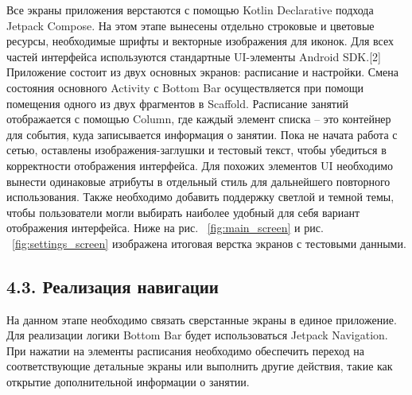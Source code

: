 \documentclass{vsureport}
\begin{document}
Все экраны приложения верстаются с помощью Kotlin Declarative подхода Jetpack Compose. На этом этапе вынесены отдельно строковые и цветовые ресурсы, необходимые шрифты и векторные изображения для иконок. Для всех частей интерфейса используются стандартные UI-элементы Android SDK.[2]
Приложение состоит из двух основных экранов: расписание и настройки. Смена состояния основного Activity с Bottom Bar осуществляется при помощи помещения одного из двух фрагментов в Scaffold. Расписание занятий отображается с помощью Column, где каждый элемент списка – это контейнер для события, куда записывается информация о занятии. Пока не начата работа с сетью, оставлены изображения-заглушки и тестовый текст, чтобы убедиться в корректности отображения интерфейса. \cite{ref8}
Для похожих элементов UI необходимо вынести одинаковые атрибуты в отдельный стиль для дальнейшего повторного использования. Также необходимо добавить поддержку светлой и темной темы, чтобы пользователи могли выбирать наиболее удобный для себя вариант отображения интерфейса. Ниже на рис. ~\ref{fig:main_screen} и рис. ~\ref{fig:settings_screen} изображена итоговая верстка экранов с тестовыми данными.


\subsection*{4.3. Реализация навигации}
На данном этапе необходимо связать сверстанные экраны в единое приложение. Для реализации логики Bottom Bar будет использоваться Jetpack Navigation. При нажатии на элементы расписания необходимо обеспечить переход на соответствующие детальные экраны или выполнить другие действия, такие как открытие дополнительной информации о занятии. \cite{ref8}
\end{document}
